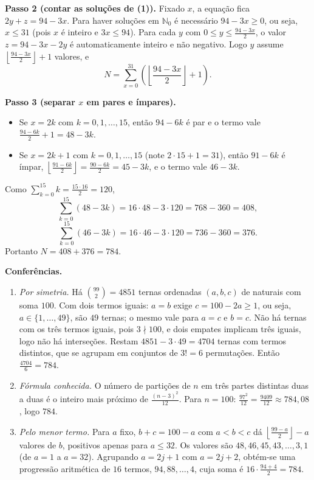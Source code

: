 \documentclass{article}%
\begin{document}
\textbf{Passo 2 (contar as soluções de (1)).} Fixado $x$, a equação fica $2y+z = 94-3x$. Para haver soluções em $\mathbb{N}_0$ é necessário $94-3x \ge 0$, ou seja, $x \le 31$ (pois $x$ é inteiro e $3x \le 94$). Para cada $y$ com $0 \le y \le \frac{94-3x}{2}$, o valor $z = 94-3x-2y$ é automaticamente inteiro e não negativo. Logo $y$ assume $\left\lfloor \frac{94-3x}{2} \right\rfloor + 1$ valores, e
\[
N = \sum_{x=0}^{31} \left( \left\lfloor \frac{94-3x}{2} \right\rfloor + 1 \right).
\]

\textbf{Passo 3 (separar $x$ em pares e ímpares).}
\begin{itemize}
\item Se $x = 2k$ com $k=0,1,\ldots,15$, então $94-6k$ é par e o termo vale $\frac{94-6k}{2}+1 = 48-3k$.
\item Se $x = 2k+1$ com $k=0,1,\ldots,15$ (note $2\cdot 15+1 = 31$), então $91-6k$ é ímpar, $\left\lfloor \frac{91-6k}{2} \right\rfloor = \frac{90-6k}{2} = 45-3k$, e o termo vale $46-3k$.
\end{itemize}
Como $\sum_{k=0}^{15} k = \frac{15\cdot 16}{2} = 120$,
\[
\sum_{k=0}^{15} (48-3k) = 16\cdot 48 - 3\cdot 120 = 768 - 360 = 408,
\]
\[
\sum_{k=0}^{15} (46-3k) = 16\cdot 46 - 3\cdot 120 = 736 - 360 = 376.
\]
Portanto $N = 408 + 376 = 784$.

\textbf{Conferências.}
\begin{enumerate}
\item \emph{Por simetria.} Há $\binom{99}{2} = 4851$ ternas ordenadas $(a,b,c)$ de naturais com soma $100$. Com dois termos iguais: $a=b$ exige $c = 100-2a \ge 1$, ou seja, $a \in \{1,\ldots,49\}$, são $49$ ternas; o mesmo vale para $a=c$ e $b=c$. Não há ternas com os três termos iguais, pois $3 \nmid 100$, e dois empates implicam três iguais, logo não há interseções. Restam $4851 - 3\cdot 49 = 4704$ ternas com termos distintos, que se agrupam em conjuntos de $3! = 6$ permutações. Então $\frac{4704}{6} = 784$. \checkmark
\item \emph{Fórmula conhecida.} O número de partições de $n$ em três partes distintas duas a duas é o inteiro mais próximo de $\frac{(n-3)^2}{12}$. Para $n=100$: $\frac{97^2}{12} = \frac{9409}{12} \approx 784{,}08$, logo $784$. \checkmark
\item \emph{Pelo menor termo.} Para $a$ fixo, $b+c = 100-a$ com $a<b<c$ dá $\left\lfloor \frac{99-a}{2} \right\rfloor - a$ valores de $b$, positivos apenas para $a \le 32$. Os valores são $48, 46, 45, 43, \ldots, 3, 1$ (de $a=1$ a $a=32$). Agrupando $a=2j+1$ com $a=2j+2$, obtém-se uma progressão aritmética de $16$ termos, $94, 88, \ldots, 4$, cuja soma é $16\cdot\frac{94+4}{2} = 784$. \checkmark
\end{enumerate}
\end{document}
